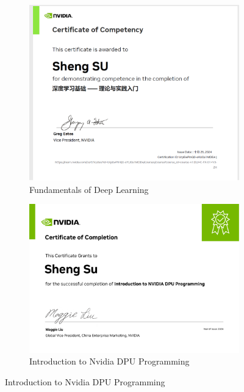 \documentclass[12pt]{article}
\begin{document}
\begin{figure}[H]
	\small
	\centering
	\begin{subfigure}[b]{0.48\textwidth}
		\includegraphics[width=\linewidth]{Sheng_Su_FDL_Certification.png}
		\caption{Fundamentals of Deep Learning}
	\end{subfigure}
	\hfill
	\begin{subfigure}[b]{0.48\textwidth}
		\includegraphics[width=\linewidth]{Sheng_Su_INDP_Certification.pdf}
		\caption{Introduction to Nvidia DPU Programming}
	\end{subfigure}
	
	\vspace{1em}
	

\end{figure}
\end{document}
